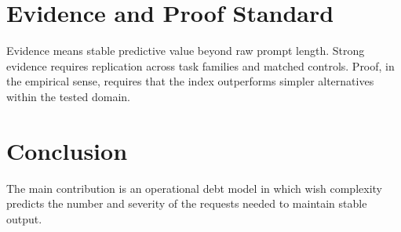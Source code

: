 \documentclass[11pt]{article}
\begin{document}
\section{Evidence and Proof Standard}
Evidence means stable predictive value beyond raw prompt length. Strong evidence requires replication across task families and matched controls. Proof, in the empirical sense, requires that the index outperforms simpler alternatives within the tested domain.

\section{Conclusion}
The main contribution is an operational debt model in which wish complexity predicts the number and severity of the requests needed to maintain stable output.

\nocite{*}


\end{document}

